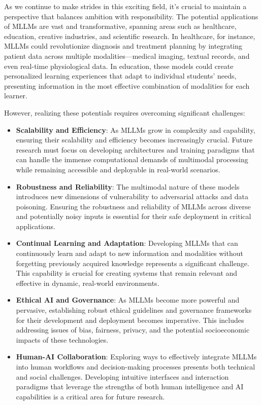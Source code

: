 As we continue to make strides in this exciting field, it's crucial to maintain a perspective that balances ambition with responsibility. The potential applications of MLLMs are vast and transformative, spanning areas such as healthcare, education, creative industries, and scientific research. In healthcare, for instance, MLLMs could revolutionize diagnosis and treatment planning by integrating patient data across multiple modalities—medical imaging, textual records, and even real-time physiological data. In education, these models could create personalized learning experiences that adapt to individual students' needs, presenting information in the most effective combination of modalities for each learner.

However, realizing these potentials requires overcoming significant challenges:

\begin{itemize}
    \item \textbf{Scalability and Efficiency}: As MLLMs grow in complexity and capability, ensuring their scalability and efficiency becomes increasingly crucial. Future research must focus on developing architectures and training paradigms that can handle the immense computational demands of multimodal processing while remaining accessible and deployable in real-world scenarios.

    \item \textbf{Robustness and Reliability}: The multimodal nature of these models introduces new dimensions of vulnerability to adversarial attacks and data poisoning. Ensuring the robustness and reliability of MLLMs across diverse and potentially noisy inputs is essential for their safe deployment in critical applications.

    \item \textbf{Continual Learning and Adaptation}: Developing MLLMs that can continuously learn and adapt to new information and modalities without forgetting previously acquired knowledge represents a significant challenge. This capability is crucial for creating systems that remain relevant and effective in dynamic, real-world environments.

    \item \textbf{Ethical AI and Governance}: As MLLMs become more powerful and pervasive, establishing robust ethical guidelines and governance frameworks for their development and deployment becomes imperative. This includes addressing issues of bias, fairness, privacy, and the potential socioeconomic impacts of these technologies.

    \item \textbf{Human-AI Collaboration}: Exploring ways to effectively integrate MLLMs into human workflows and decision-making processes presents both technical and social challenges. Developing intuitive interfaces and interaction paradigms that leverage the strengths of both human intelligence and AI capabilities is a critical area for future research.
\end{itemize}

